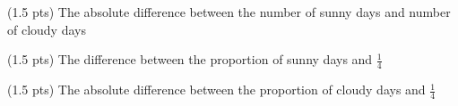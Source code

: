\begin{prob}[(6 pts)]
\begin{subprobset}
\begin{subprob}(1.5 pts) The absolute difference between the number of sunny days and number of cloudy days


\end{subprob}

\begin{subprob}(1.5 pts) The difference between the proportion of sunny days and $\frac{1}{4}$


\end{subprob}

\begin{subprob}(1.5 pts) The absolute difference between the proportion of cloudy days and $\frac{1}{4}$


\end{subprob}
    
\end{subprobset}

\end{prob}

\newpage

